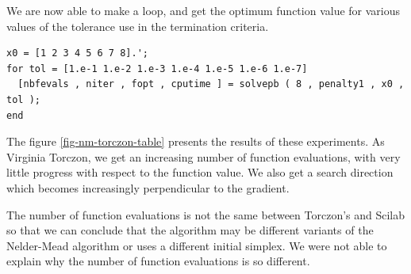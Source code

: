 We are now able to make a loop, and get the optimum function value 
for various values of the tolerance use in the termination criteria.

\lstset{language=scilabscript}
\begin{lstlisting}
x0 = [1 2 3 4 5 6 7 8].';
for tol = [1.e-1 1.e-2 1.e-3 1.e-4 1.e-5 1.e-6 1.e-7]
  [nbfevals , niter , fopt , cputime ] = solvepb ( 8 , penalty1 , x0 , tol );
end
\end{lstlisting}

The figure \ref{fig-nm-torczon-table} presents the results of these
experiments. As Virginia Torczon, we get an increasing number 
of function evaluations, with very little progress with respect 
to the function value. We also get a search direction which becomes
increasingly perpendicular to the gradient.

The number of function evaluations is not the same between 
Torczon's and Scilab so that we can conclude that the algorithm may be different 
variants of the Nelder-Mead algorithm or uses a different 
initial simplex. We were not able to explain why the number 
of function evaluations is so different.

